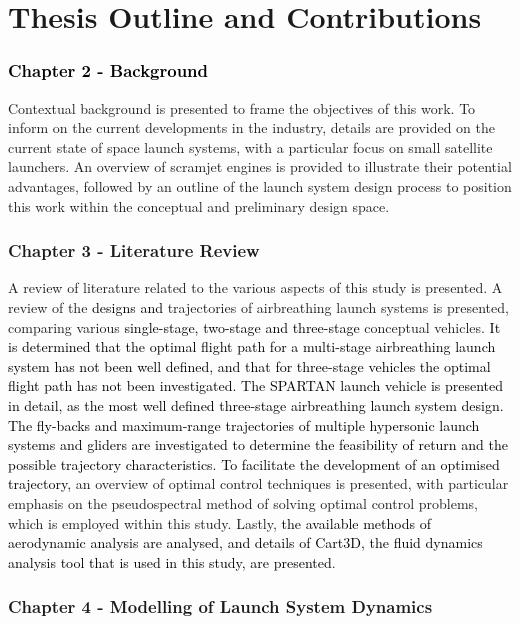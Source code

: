   \clearpage
  \section{Thesis Outline and Contributions}

    \textcolor{black}{
    \subsubsection*{Chapter 2 - Background}
}
	Contextual background is presented to frame the objectives of this work. To inform on the current developments in the industry, details are provided on the current state of space launch systems, with a particular focus on small satellite launchers. An overview of scramjet engines is provided to illustrate their potential advantages, followed by an outline of the launch system design process to position this work within the conceptual and preliminary design space.

    \subsubsection*{Chapter 3 - Literature Review}
\texttt{}
      A review of literature related to the various aspects of this study is presented. A review of the \textcolor{black}{designs and }trajectories of airbreathing launch systems is presented, comparing various \textcolor{black}{single-stage, two-stage and three-stage} conceptual vehicles. \textcolor{black}{It is determined that the optimal flight path for a multi-stage airbreathing launch system has not been well defined, and that for three-stage vehicles the optimal flight path has not been investigated. The SPARTAN launch vehicle is presented in detail, as the most well defined three-stage airbreathing launch system design. The fly-backs and maximum-range trajectories of multiple hypersonic launch systems and gliders are investigated to determine the feasibility of return and the possible trajectory characteristics.} \textcolor{black}{To facilitate the development of an optimised trajectory, }an overview of optimal control techniques is presented, with particular emphasis on the pseudospectral method of solving optimal control problems, which is employed within this study. Lastly, \textcolor{black}{the available methods of aerodynamic analysis are analysed, and details of Cart3D, the fluid dynamics analysis tool that is used in this study, are presented}.
      

    \subsubsection*{Chapter 4 - Modelling of Launch System Dynamics}

